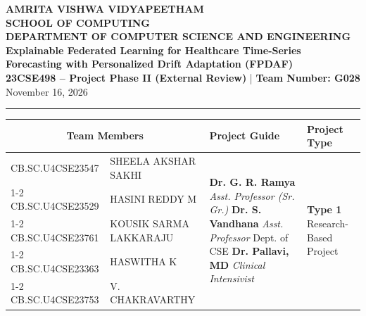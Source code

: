 \documentclass[11pt, a4paper]{article}
\begin{document}
\noindent
\begin{minipage}{\textwidth}
    \centering
    {\Large \textbf{\textcolor{amritaMaroon}{
    AMRITA VISHWA VIDYAPEETHAM \\
    SCHOOL OF COMPUTING \\
    DEPARTMENT OF COMPUTER SCIENCE AND ENGINEERING \\
    }}}
    \vspace{0.2cm}
    {\large \textbf{Explainable Federated Learning for Healthcare Time-Series Forecasting with Personalized Drift Adaptation (FPDAF)}} \\[0.1cm]
    \textbf{23CSE498 -- Project Phase II (External Review)} \quad | \quad \textbf{Team Number: G028} \\
    November 16, 2026
\end{minipage}

\vspace{0.3cm}
\hrule
\vspace{0.3cm}

\noindent
\begin{center}
    \renewcommand{\arraystretch}{1.35}
    \setlength{\tabcolsep}{5pt}
    \small
    \begin{tabular}{|l|p{4.6cm}|p{4.4cm}|p{3.0cm}|}
        \hline
        \multicolumn{2}{|c|}{\textbf{Team Members}} & \textbf{Project Guide} & \textbf{Project Type} \\
        \hline
        CB.SC.U4CSE23547 & SHEELA AKSHAR SAKHI &
        \multirow{5}{=}{\raggedright \textbf{Dr. G. R. Ramya} \newline \textit{Asst. Professor (Sr. Gr.)} \newline \textbf{Dr. S. Vandhana} \newline \textit{Asst. Professor} \newline Dept. of CSE \newline \textbf{Dr. Pallavi, MD} \newline \textit{Clinical Intensivist}} &
        \multirow{5}{=}{\raggedright \textbf{Type 1} \newline Research-Based Project} \\ \cline{1-2}
        CB.SC.U4CSE23529 & HASINI REDDY M & & \\ \cline{1-2}
        CB.SC.U4CSE23761 & KOUSIK SARMA LAKKARAJU & & \\ \cline{1-2}
        CB.SC.U4CSE23363 & HASWITHA K & & \\ \cline{1-2}
        CB.SC.U4CSE23753 & V. CHAKRAVARTHY & & \\
        \hline
    \end{tabular}
\end{center}
\vspace{0.2cm}
\end{document}
